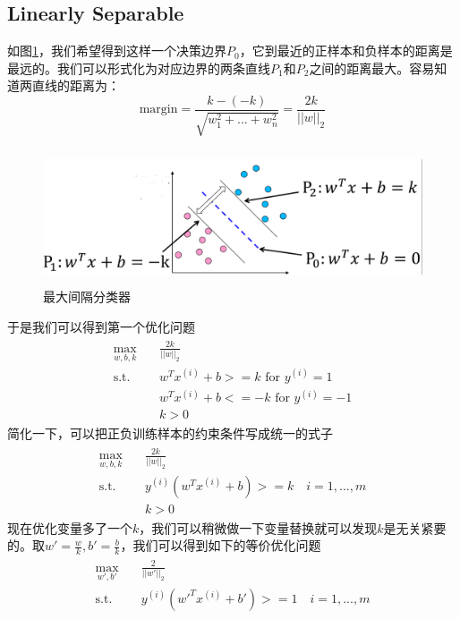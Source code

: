 \documentclass[11pt]{article}
\begin{document}
\subsection{Linearly Separable}
如图\ref{img1}，我们希望得到这样一个决策边界$P_0$，它到最近的正样本和负样本的距离是最远的。我们可以形式化为对应边界的两条直线$P_1$和$P_2$之间的距离最大。容易知道两直线的距离为：
\begin{equation}
\text{margin} = \frac{k - (-k)}{\sqrt{w_1^2+...+w_n^2}} = \frac{2k}{||w||_2}
\end{equation}
\begin{figure}
	\centering
	\includegraphics[height=4cm]{images/img4.png}
	\caption{最大间隔分类器}
	\label{img1}
\end{figure}
于是我们可以得到第一个优化问题
\begin{align}
\begin{split}
\max_{w, b, k}\quad&\frac{2k}{||w||_2}\\
\text{s.t.}\quad&w^Tx^{(i)}+b>=k\text{ for }y^{(i)}=1\\
&w^Tx^{(i)}+b<=-k\text{ for }y^{(i)}=-1\\
&k>0
\end{split}
\end{align}
简化一下，可以把正负训练样本的约束条件写成统一的式子
\begin{align}
\begin{split}
\max_{w, b, k}\quad&\frac{2k}{||w||_2}\\
\text{s.t.}\quad&y^{(i)}(w^Tx^{(i)}+b)>=k\quad i = 1,...,m\\
&k>0
\end{split}
\end{align}
现在优化变量多了一个$k$，我们可以稍微做一下变量替换就可以发现$k$是无关紧要的。取$w'=\frac{w}{k}, b'=\frac{b}{k}$，我们可以得到如下的等价优化问题
\begin{align}
\begin{split}
\max_{w', b'}\quad&\frac{2}{||w'||_2}\\
\text{s.t.}\quad&y^{(i)}(w'^Tx^{(i)}+b')>=1\quad i = 1,...,m\\
\end{split}
\end{align}
\end{document}
